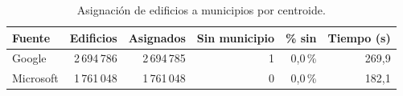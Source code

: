 \begin{table}[H]
\centering\small
\caption{Asignación de edificios a municipios por centroide.}
\label{tab:asignacion}
\begin{tabular}{@{}lrrrrr@{}}
\toprule
\textbf{Fuente} & \textbf{Edificios} & \textbf{Asignados} & \textbf{Sin municipio} & \textbf{\% sin} & \textbf{Tiempo (s)} \\
\midrule
Google & 2\,694\,786 & 2\,694\,785 & 1 & 0,0\,\% & 269,9 \\
Microsoft & 1\,761\,048 & 1\,761\,048 & 0 & 0,0\,\% & 182,1 \\
\bottomrule
\end{tabular}
\end{table}
